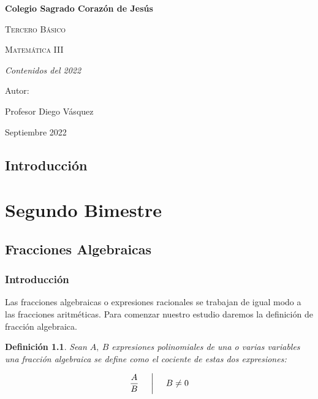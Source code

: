 \documentclass[letterpaper, 10pt, oneside]{book}
\newtheorem{definition}{Definición}[section]
\begin{document}
	
	\thispagestyle{empty}
	\begin{titlepage}
		\centering
		{\bfseries\LARGE Colegio Sagrado Corazón de Jesús \par}
		\vspace{1cm}
		{\scshape\Large Tercero Básico \par}
		\vspace{3cm}
		{\scshape\Huge Matemática III \par}
		\vspace{3cm}
		{\itshape\Large Contenidos del 2022 \par}
		\vfill
		{\Large Autor: \par}
		{\Large Profesor Diego Vásquez \par}
		\vfill
		{\Large Septiembre 2022 \par}
	\end{titlepage}
	
	\frontmatter
	\tableofcontents
	
	\chapter{Introducción}
	\let\cleardoublepage\clearpage
	
	\mainmatter
	\setcounter{page}{3}
	
	\part{Segundo Bimestre}
	\chapter{Fracciones Algebraicas}
	\section{Introducción}
	Las fracciones algebraicas o expresiones racionales se trabajan de igual modo a las fracciones aritméticas. Para comenzar nuestro estudio daremos la definición de fracción algebraica.
	
	\vspace{5mm}
	
	\begin{definition}
		Sean $A, \ B$ expresiones polinomiales de una o varias variables una fracción algebraica se define como el cociente de estas dos expresiones: 
		
		$$\frac{A}{B} \hspace{5mm} \bigg| \hspace{5mm}  B\neq 0$$
	\end{definition}
	
\end{document}
